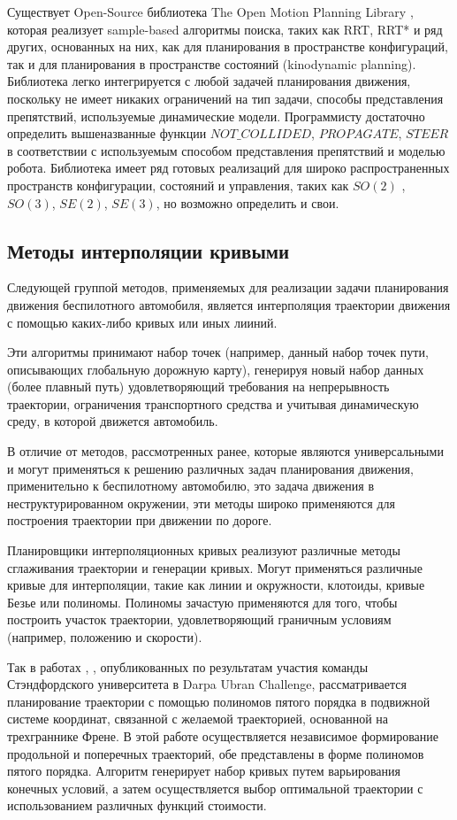 Существует Open-Source библиотека The Open Motion Planning Library \cite{motion_planning_ompl}, которая реализует
sample-based алгоритмы поиска, таких как RRT, RRT* и ряд других, основанных на них, как для планирования в
пространстве конфигураций, так и для планирования в пространстве состояний (kinodynamic planning). Библиотека легко
интегрируется с любой задачей планирования движения, поскольку не имеет никаких ограничений на тип задачи, способы
представления препятствий, используемые динамические модели. Программисту достаточно определить вышеназванные
функции $NOT\_COLLIDED$, $PROPAGATE$, $STEER$ в соответствии с используемым способом представления препятствий и моделью
робота. Библиотека имеет ряд готовых реализаций для широко распространенных пространств конфигурации, состояний и
управления, таких как $SO(2)$ , $SO(3)$, $SE(2)$, $SE(3)$, но возможно определить и свои.


\subsection{Методы интерполяции кривыми}

Следующей группой методов, применяемых для реализации задачи планирования движения беспилотного
автомобиля, является интерполяция траектории движения с помощью каких-либо кривых или иных лииний.

Эти алгоритмы принимают набор точек (например, данный набор точек пути, описывающих глобальную дорожную карту),
генерируя новый набор данных (более плавный путь) удовлетворяющий требования на непрерывность траектории,
ограничения транспортного средства и учитывая динамическую среду, в которой движется автомобиль.

В отличие от методов, рассмотренных ранее, которые являются универсальными и могут применяться к решению
различных задач планирования движения, применительно к беспилотному автомобилю, это задача движения
в неструктурированном окружении,  эти методы широко применяются для построения траектории при движении
по дороге.

Планировщики интерполяционных кривых реализуют различные методы сглаживания траектории и генерации кривых.
Могут применяться различные кривые для интерполяции, такие как линии и окружности, клотоиды, кривые Безье
или полиномы. Полиномы зачастую применяются для того, чтобы построить участок траектории, удовлетворяющий
граничным условиям (например, положению и скорости).

Так в работах \cite{darpa_junior_path_planning_1}, \cite{darpa_junior_frenet},
опубликованных по результатам участия команды Стэндфордского университета в Darpa Ubran Challenge,
рассматривается планирование траектории с помощью полиномов пятого порядка в подвижной системе координат,
связанной с желаемой траекторией, основанной на трехграннике Френе.  В этой работе осуществляется независимое
формирование продольной и поперечных траекторий, обе представлены в форме полиномов пятого порядка. Алгоритм генерирует
набор кривых путем варьирования конечных условий, а затем осуществляется выбор оптимальной траектории с использованием
различных функций стоимости.

